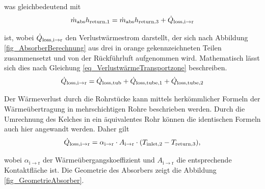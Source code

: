 \vspace*{-\baselineskip}was gleichbedeutend mit
\begin{equation} \label{eq_EnergiebilanzTransportzone2}
    \dot{m}_{\mathrm{abs}}h_{\mathrm{return,}1} = \dot{m}_{\mathrm{abs}}h_{\mathrm{return,}3}+\dot{Q}_{\mathrm{loss,i \to r}}
\end{equation}

\vspace*{-\baselineskip}ist, wobei $\dot{Q}_{\mathrm{loss,i \to r}}$ den Verlustwärmestrom darstellt, der sich nach Abbildung \ref{fig_AbsorberBerechnung} aus drei in orange gekennzeichneten Teilen zusammensetzt und von der Rückführluft aufgenommen wird.
Mathematisch lässt sich dies nach Gleichung \ref{eq_VerlustwärmeTransportzone} beschreiben.
\begin{equation} \label{eq_VerlustwärmeTransportzone}
    \dot{Q}_{\mathrm{loss,i \to r}} = \dot{Q}_{\mathrm{loss,tub}} + \dot{Q}_{\mathrm{loss,tube,1}} + \dot{Q}_{\mathrm{loss,tube,2}}
\end{equation}

Der Wärmeverlust durch die Rohrstücke kann mittels herkömmlicher Formeln der Wärmeübertragung in mehrschichtigen Rohre beschrieben werden.
Durch die Umrechnung des Kelches in ein äquivalentes Rohr können die identischen Formeln auch hier angewandt werden.
Daher gilt
\begin{equation} \label{eq_VerlustwärmeTransportzone2}
\dot{Q}_{\mathrm{loss,i \to r}}= \alpha_{\mathrm{i\to r}} \cdot A_{\mathrm{i\to r}} \cdot (T_{\mathrm{inlet,}2} - T_{\mathrm{return,}3}),
\end{equation}

\vspace*{-\baselineskip}wobei $\alpha_{\mathrm{i\to r}}$ der Wärmeübergangskoeffizient und $A_{\mathrm{i\to r}}$ die entsprechende Kontaktfläche ist.
Die Geometrie des Absorbers zeigt die Abbildung \ref{fig_GeometrieAbsorber}.

